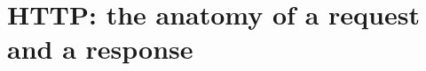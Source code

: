 \chapter{HTTP: the anatomy of a request and a response}
\label{ch:http-the-anatomy-of-a-request-and-a}

